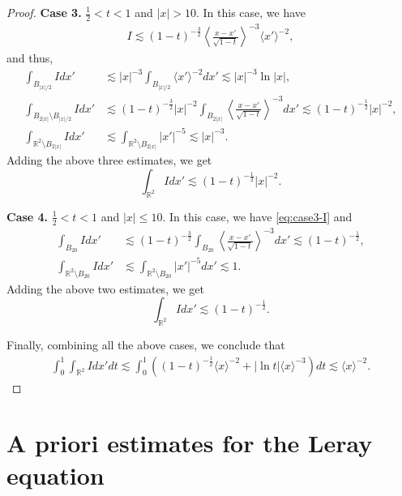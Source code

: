 \documentclass[12pt,reqno]{amsart}
\theoremstyle{plain}
\theoremstyle{definition}
\newcommand{\R}{\mathbb{R}}
\renewcommand{\:}{\colon}
\numberwithin{equation}{section}
\numberwithin{figure}{section}
\begin{document}
\begin{proof}
    \smallskip
    \textbf{Case 3.} $  \frac12< t < 1$ and $|x|>10$. In this case, we have
    \begin{align} \label{eq:case3-I}
        I \lesssim (1-t)^{-\frac32} \left\langle \frac{x-x'}{\sqrt{1-t}} \right\rangle^{-3}  \langle x' \rangle^{-2},
    \end{align}
    and thus, 
    \begin{align}
        \int_{B_{|x|/2}} I dx' &\lesssim |x|^{-3} \int_{B_{|x|/2} } \langle x' \rangle^{-2} dx' \lesssim |x|^{-3} \ln |x|,\\
        \int_{B_{2|x|} \setminus B_{|x|/2}} I dx' &\lesssim (1-t)^{-\frac32} |x|^{-2} \int_{B_{2|x|}} \left\langle \frac{x-x'}{\sqrt{1-t}} \right\rangle^{-3} dx' \lesssim (1-t)^{-\frac12} |x|^{-2}, \\
        \int_{\R^2 \setminus B_{2|x|}} I dx' &\lesssim \int_{\R^2 \setminus B_{2|x|}} |x'|^{-5}  \lesssim |x|^{-3}.
    \end{align}
    Adding the above three estimates, we get
    \begin{equation}
        \int_{\R^2} I dx' \lesssim (1-t)^{-\frac12}  |x|^{-2}. 
    \end{equation}

       \smallskip
    \textbf{Case 4.} $  \frac12< t < 1$ and $|x| \le 10$. In this case, we have \eqref{eq:case3-I} and
    \begin{align}
        \int_{B_{20}} I dx' &\lesssim (1-t)^{-\frac32} \int_{B_{20}} \left\langle \frac{x-x'}{\sqrt{1-t}} \right\rangle^{-3} dx' \lesssim (1-t)^{-\frac12},  \\
        \int_{\R^2 \setminus B_{20}} I dx' &\lesssim  \int_{\R^2 \setminus B_{20}} |x'|^{-5} dx' \lesssim 1. 
    \end{align}
    Adding the above two estimates, we get
    \begin{equation}
        \int_{\R^2} I dx' \lesssim (1-t)^{-\frac12}. 
    \end{equation}

    \smallskip
    Finally, combining all the above cases, we conclude that
    \begin{align}
        \int_0^1 \int_{\R^2} I dx' dt \lesssim \int_0^1 \left(  (1-t)^{-\frac12} \langle x \rangle^{-2}  + |\ln t| \langle x \rangle^{-3}  \right) dt \lesssim \langle x \rangle^{-2}.
    \end{align}
\end{proof}


\section{A priori estimates for the Leray equation} \label{sec:elliptic}
\end{document}
